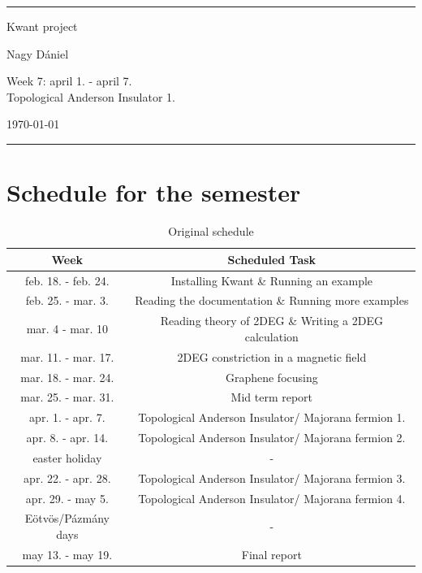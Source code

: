 \documentclass[12pt]{article}
\numberwithin{equation}{section}
\begin{document}
\begin{center}

\thispagestyle{empty}

\rule{10 cm}{2pt}

\vspace{1.5cm}
{ \Large Kwant project}

\vspace{1.0cm}
Nagy Dániel

\vspace{0.5cm}
Week 7: april 1. - april 7. \\
Topological Anderson Insulator 1.

\vspace{0.5cm}
\today

\vspace{0.25cm}
\rule{10 cm}{2pt}

\end{center}
\newpage

\newpage
{}

\section{Schedule for the semester}
\begin{table}[ht]
  \centering
  \caption{Original schedule}
  \begin{tabular}{|c|c|}
  \hline
  Week & Scheduled Task \\ [0.5ex]  \hline %
  feb. 18. - feb. 24. & Installing Kwant \& Running an example \\ \hline
  feb. 25. - mar. 3. & Reading the documentation \& Running more examples \\ \hline
  mar. 4 - mar. 10 & Reading theory of 2DEG \& Writing a 2DEG calculation \\ \hline 
  mar. 11. - mar. 17. & 2DEG constriction in a magnetic field \\ \hline
  mar. 18. -  mar. 24. & Graphene focusing \\ \hline
  mar. 25. -  mar. 31. & Mid term report \\ \hline
  apr. 1. -  apr. 7. & Topological Anderson Insulator/ Majorana fermion 1. \\ \hline
  apr. 8. -  apr. 14. & Topological Anderson Insulator/ Majorana fermion 2. \\ \hline
  easter holiday & - \\ \hline
  apr. 22. - apr. 28. & Topological Anderson Insulator/ Majorana fermion 3. \\ \hline 
  apr. 29. - may 5. & Topological Anderson Insulator/ Majorana fermion 4. \\ \hline 
  Eötvös/Pázmány days & - \\ \hline
  may 13. - may 19. & Final report \\ \hline

  \end{tabular}
\end{table}
\end{document}
